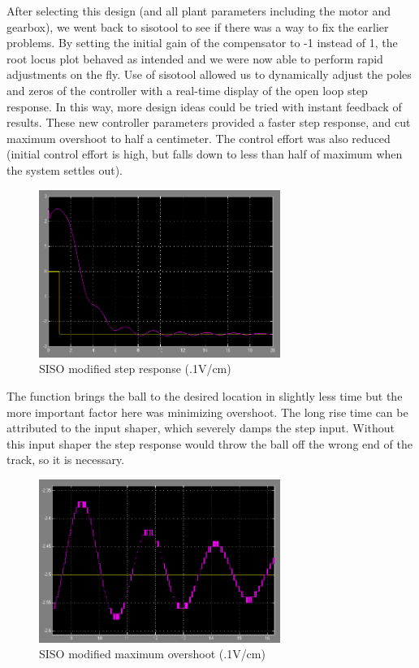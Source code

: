 After selecting this design (and all plant parameters including the motor and gearbox), we went back to sisotool to see if there was a way to fix the earlier problems. By setting the initial gain of the compensator to -1 instead of 1, the root locus plot behaved as intended and we were now able to perform rapid adjustments on the fly. Use of sisotool allowed us to dynamically adjust the poles and zeros of the controller with a real-time display of the open loop step response. In this way, more design ideas could be tried with instant feedback of results. These new controller parameters provided a faster step response, and cut maximum overshoot to half a centimeter. The control effort was also reduced (initial control effort is high, but falls down to less than half of maximum when the system settles out).

\begin{figure}[h]
	\centering
		\includegraphics[width=0.70\textwidth]{pics/sisostep}
	\caption{SISO modified step response (.1V/cm)}
	\label{3:fig:sisostep}
\end{figure}

The function brings the ball to the desired location in slightly less time but the more important factor here was minimizing overshoot. The long rise time can be attributed to the input shaper, which severely damps the step input. Without this input shaper the step response would throw the ball off the wrong end of the track, so it is necessary.

\begin{figure}[h]
	\centering
		\includegraphics[width=0.70\textwidth]{pics/sisots}
	\caption{SISO modified maximum overshoot (.1V/cm)}
	\label{3:fig:sisots}
\end{figure}


